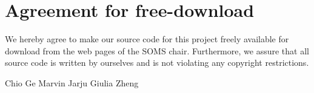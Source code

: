 \documentclass[11pt]{article}
\begin{document}

\newpage


\newpage
\section*{Agreement for free-download}
\bigskip


\bigskip


\large We hereby agree to make our source code for this project freely available for download from the web pages of the SOMS chair. Furthermore, we assure that all source code is written by ourselves and is not violating any copyright restrictions.

\begin{center}

\bigskip


\bigskip

    \large Chio Ge \hspace{1.5cm} Marvin Jarju \hspace{1.5cm} Giulia Zheng

\end{center}
\newpage







\tableofcontents

\newpage

\end{document}
